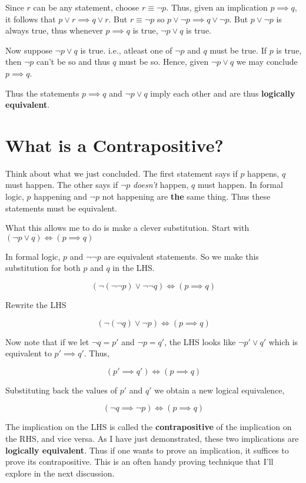 Since $r$ can be any statement, choose $r \equiv \neg p$. Thus, given an implication $p \implies q$, it follows that $p \vee r \implies q \vee r$. But $r \equiv \neg p$ so $p \vee \neg p \implies q \vee \neg p$. But $p \vee \neg p$ is always true, thus whenever $p \implies q$ is true, $\neg p \vee q$ is true.

Now suppose $\neg p \vee q$ is true. i.e., atleast one of $\neg p$ and $q$ must be true. If $p$ is true, then $\neg p$ can't be so and thus $q$ must be so. Hence, given $\neg p \vee q$ we may conclude $p \implies q$.

Thus the statements $p \implies q$ and $\neg p \vee q$ imply each other and are thus \textbf{logically equivalent}.

\section*{What is a Contrapositive?}
Think about what we just concluded. The first statement says if $p$ happens, $q$ must happen. The other says if $\neg p$ \textit{doesn't} happen, $q$ must happen. In formal logic, $p$ happening and $\neg p$ not happening are \textbf{the} same thing. Thus these statements must be equivalent.

What this allows me to do is make a clever substitution. Start with $(\neg p \vee q) \iff (p \implies q)$

In formal logic, $p$ and $\neg \neg p$ are equivalent statements. So we make this substitution for both $p$ and $q$ in the LHS.

$$(\neg (\neg \neg p) \vee \neg \neg q) \iff (p \implies q)$$

Rewrite the LHS

$$(\neg(\neg q) \vee \neg p) \iff (p \implies q)$$

Now note that if we let $\neg q = p'$ and $\neg p = q'$, the LHS looks like $\neg p' \vee q'$ which is equivalent to $p' \implies q'$. Thus,

$$(p' \implies q') \iff (p \implies q)$$

Substituting back the values of $p'$ and $q'$ we obtain a new logical equivalence,

$$(\neg q \implies \neg p) \iff (p \implies q)$$

The implication on the LHS is called the \textbf{contrapositive} of the implication on the RHS, and vice versa. As I have just demonstrated, these two implications are \textbf{logically equivalent}. Thus if one wants to prove an implication, it suffices to prove its contrapositive. This is an often handy proving technique that I'll explore in the next discussion.\\

